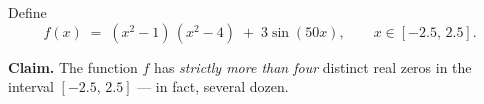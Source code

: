 \begin{problem}
Define
\[
  f(x) \;=\; (x^{2} - 1)\,(x^{2} - 4) \;+\; 3\sin(50 x),
  \qquad x \in [-2.5,\, 2.5].
\]

\textbf{Claim.} The function $f$ has \emph{strictly more than four}
distinct real zeros in the interval $[-2.5,\, 2.5]$ --- in fact,
several dozen.
\end{problem}
